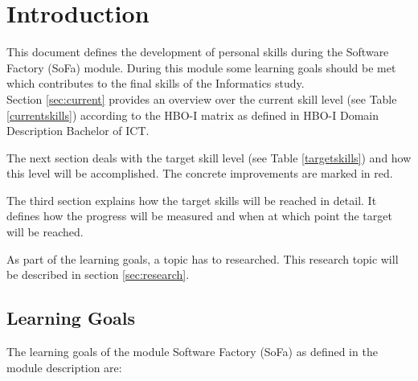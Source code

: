 \section{Introduction}
\label{sec:intro}


This document defines the development of personal skills during the Software Factory (SoFa) module.
During this module some learning goals should be met which contributes to the final skills of the Informatics study.
~\\
Section \ref{sec:current} provides an overview over the current skill level (see Table \ref{currentskills}) according to the HBO-I matrix as defined in \glqq HBO-I Domain Description Bachelor of ICT\grqq.

The next section deals with the target skill level (see Table \ref{targetskills}) and how this level will be accomplished. The concrete improvements are marked in red.

The third section explains how the target skills will be reached in detail. It defines how the progress will be measured and when at which point the target will be reached.

As part of the learning goals, a topic has to researched. This research topic will be described in section \ref{sec:research}.



\subsection{Learning Goals}
\label{ssec:learning}
The learning goals of the module Software Factory (SoFa) as defined in the module description are:

